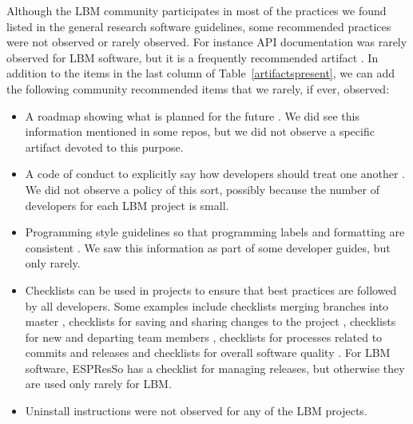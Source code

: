 \documentclass[final, 3p, times, authoryear]{elsarticle}
\begin{document}
Although the LBM community participates in most of the practices we found listed
in the general research software guidelines, some recommended practices were not
observed or rarely observed. For instance API documentation was rarely observed
for LBM software, but it is a frequently recommended artifact
\citep{SmithAndRoscoe2018, ThielEtAl2020, vanGompelEtAl2016, OrvizEtAl2017,
SSI2022, Zadka2018}.  In addition to the items in the last column of
Table~\ref{artifactspresent}, we can add the following community recommended
items that we rarely, if ever, observed:

\begin{itemize}
\item A roadmap showing what is planned for the future \citep{Yo2021,
ThielEtAl2020, vanGompelEtAl2016}.  We did see this information mentioned in
some repos, but we did not observe a specific artifact devoted to this purpose.
\item A code of conduct to explicitly say how developers should treat one
another \citep{Yo2021, ThielEtAl2020}.  We did not observe a policy of this
sort, possibly because the number of developers for each LBM project is small.
\item Programming style guidelines so that programming labels and formatting are
consistent \citep{TobiasEtAl2018, ThielEtAl2020, OrvizEtAl2017, Zadka2018,
vanGompelEtAl2016, WilsonEtAl2014}.  We saw this information as part of
some developer guides, but only rarely.
\item Checklists can be used in projects to ensure that best practices are
followed by all developers.  Some examples include checklists merging branches
into master \citep{Brown2015}, checklists for saving and sharing changes to the
project \citep{WilsonEtAl2016}, checklists for new and departing team members
\citep{HerouxAndBernholdt2018}, checklists for processes related to commits and
releases \citep{HerouxEtAl2008} and checklists for overall software quality
\citep{ThielEtAl2020, SSI2022}.  For LBM software, ESPResSo has a checklist for
managing releases, but otherwise they are used only rarely for LBM.
\item Uninstall instructions \citep{vanGompelEtAl2016} were not observed for any
of the LBM projects.
\end{itemize}
\end{document}
